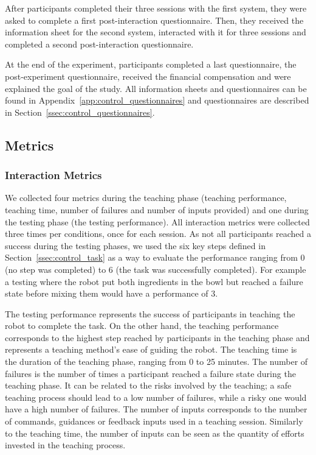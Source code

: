 After participants completed their three sessions with the first system, they were asked to complete a first post-interaction questionnaire. Then, they received the information sheet for the second system, interacted with it for three sessions and completed a second post-interaction questionnaire.

At the end of the experiment, participants completed a last questionnaire, the post-experiment questionnaire, received the financial compensation and were explained the goal of the study. All information sheets and questionnaires can be found in Appendix~\ref{app:control_questionnaires} and questionnaires are described in Section~\ref{ssec:control_questionnaires}. %

\subsection{Metrics}

\subsubsection{Interaction Metrics}

We collected four metrics during the teaching phase (teaching performance, teaching time, number of failures and number of inputs provided) and one during the testing phase (the testing performance). All interaction metrics were collected three times per conditions, once for each session. As not all participants reached a success during the testing phases, we used the six key steps defined in Section~\ref{ssec:control_task} as a way to evaluate the performance ranging from 0 (no step was completed) to 6 (the task was successfully completed). For example a testing where the robot put both ingredients in the bowl but reached a failure state before mixing them would have a performance of 3. 

The testing performance represents the success of participants in teaching the robot to complete the task. On the other hand, the teaching performance corresponds to the highest step reached by participants in the teaching phase and represents a teaching method's ease of guiding the robot. The teaching time is the duration of the teaching phase, ranging from 0 to 25 minutes. The number of failures is the number of times a participant reached a failure state during the teaching phase. It can be related to the risks involved by the teaching; a safe teaching process should lead to a low number of failures, while a risky one would have a high number of failures. The number of inputs corresponds to the number of commands, guidances or feedback inputs used in a teaching session. Similarly to the teaching time, the number of inputs can be seen as the quantity of efforts invested in the teaching process.


